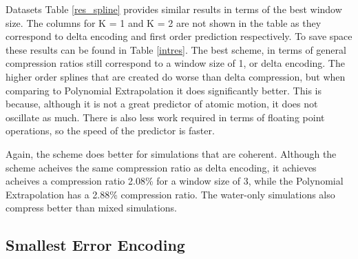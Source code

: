 \documentclass[a4paper,11pt]{report}
\begin{document}
\begin{section}{Datasets}
Table \ref{res_spline} provides similar results in terms of the best window size. The columns for K = 1 and K = 2 are not shown in the table as they correspond to delta encoding and first order prediction respectively. To save space these results can be found in Table \ref{intres}. The best scheme, in terms of general compression ratios still correspond to a window size of 1, or delta encoding. The higher order splines that are created do worse than delta compression, but when comparing to Polynomial Extrapolation it does significantly better. This is because, although it is not a great predictor of atomic motion, it does not oscillate as much. There is also less work required in terms of floating point operations, so the speed of the predictor is faster.

Again, the scheme does better for simulations that are coherent. Although the scheme acheives the same compression ratio as delta encoding, it achieves acheives a compression ratio 2.08\% for a window size of 3, while the Polynomial Extrapolation has a 2.88\% compression ratio. The water-only simulations also compress better than mixed simulations.

\subsection{Smallest Error Encoding}


\end{section}
\end{document}
